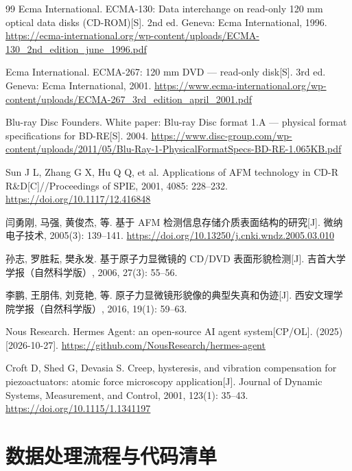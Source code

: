 \documentclass[12pt,a4paper,fontset=windows]{ctexart}
\begin{document}
\begin{thebibliography}{99}
Ecma International. ECMA-130: Data interchange on read-only 120 mm optical data disks (CD-ROM)[S]. 2nd ed. Geneva: Ecma International, 1996.
\url{https://ecma-international.org/wp-content/uploads/ECMA-130_2nd_edition_june_1996.pdf}

Ecma International. ECMA-267: 120 mm DVD --- read-only disk[S]. 3rd ed. Geneva: Ecma International, 2001.
\url{https://www.ecma-international.org/wp-content/uploads/ECMA-267_3rd_edition_april_2001.pdf}

Blu-ray Disc Founders. White paper: Blu-ray Disc format 1.A --- physical format specifications for BD-RE[S]. 2004.
\url{https://www.disc-group.com/wp-content/uploads/2011/05/Blu-Ray-1-PhysicalFormatSpecs-BD-RE-1.065KB.pdf}

Sun J L, Zhang G X, Hu Q Q, et al. Applications of AFM technology in CD-R R\&D[C]//Proceedings of SPIE, 2001, 4085: 228--232.
\url{https://doi.org/10.1117/12.416848}

闫勇刚, 马强, 黄俊杰, 等. 基于 AFM 检测信息存储介质表面结构的研究[J]. 微纳电子技术, 2005(3): 139--141. \url{https://doi.org/10.13250/j.cnki.wndz.2005.03.010}

孙志, 罗胜耘, 樊永发. 基于原子力显微镜的 CD/DVD 表面形貌检测[J]. 吉首大学学报（自然科学版）, 2006, 27(3): 55--56.

李鹏, 王朋伟, 刘竞艳, 等. 原子力显微镜形貌像的典型失真和伪迹[J]. 西安文理学院学报（自然科学版）, 2016, 19(1): 59--63.

Nous Research. Hermes Agent: an open-source AI agent system[CP/OL]. (2025)[\mbox{2026-10-27}]. \url{https://github.com/NousResearch/hermes-agent}

Croft D, Shed G, Devasia S. Creep, hysteresis, and vibration compensation for piezoactuators: atomic force microscopy application[J]. Journal of Dynamic Systems, Measurement, and Control, 2001, 123(1): 35--43.
\url{https://doi.org/10.1115/1.1341197}

\end{thebibliography}

\newpage
\appendix
\section{数据处理流程与代码清单}
\end{document}
